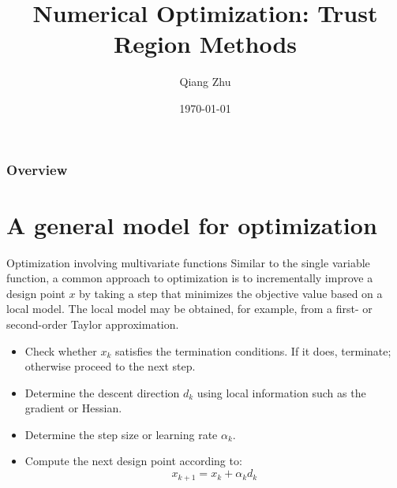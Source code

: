 \documentclass{beamer}
\title[Trust Region Methods]{Numerical Optimization: Trust Region Methods} %
\author{Qiang Zhu} %
\institute[University of Nevada Las Vegas] %
{
University of Nevada Las Vegas\\ %
\medskip
}
\date{\today} %
\begin{document}
\begin{frame}
\titlepage %
\end{frame}

\begin{frame}
\frametitle{Overview} %
\tableofcontents %
\end{frame}



\section{A general model for optimization}
\begin{frame}{Optimization involving multivariate functions}
Similar to the single variable function, a common approach to optimization is to incrementally improve a design point $x$ by taking a step that minimizes the objective value based on a local model. The local model may be obtained, for example, from a first- or second-order Taylor approximation.
\begin{itemize}
    \item Check whether $x_k$ satisfies the termination conditions. If it does, terminate; otherwise proceed to the next step.
    \item Determine the descent direction $d_k$ using local information such as the gradient or Hessian. 
    \item Determine the step size or learning rate $\alpha_k$.
    \item Compute the next design point according to:
    \begin{equation*}
        x_{k+1} = x_k + \alpha_k d_k
    \end{equation*}
\end{itemize}

\end{frame}
\end{document}
